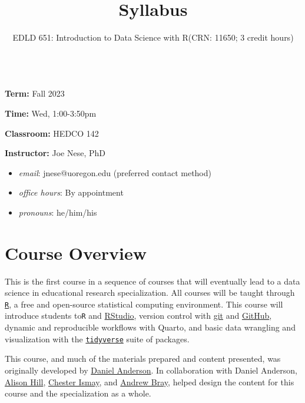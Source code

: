 \documentclass[
  letterpaper,
  DIV=11,
  numbers=noendperiod]{scrartcl}
\title{Syllabus}
\subtitle{EDLD 651: Introduction to Data Science with R(CRN: 11650; 3
credit hours)}
\author{}
\date{}
\providecommand{\tightlist}{%
  \setlength{\itemsep}{0pt}\setlength{\parskip}{0pt}}\usepackage{longtable,booktabs,array}
\renewcommand*\contentsname{Table of contents}
\newcommand\contentsname{Table of contents}
\begin{document}
\maketitle
\ifdefined\Shaded\renewenvironment{Shaded}{\begin{tcolorbox}[sharp corners, interior hidden, boxrule=0pt, frame hidden, breakable, enhanced, borderline west={3pt}{0pt}{shadecolor}]}{\end{tcolorbox}}\fi

\renewcommand*\contentsname{Table of contents}
{
\hypersetup{linkcolor=}
\setcounter{tocdepth}{4}
\tableofcontents
}
\strut \\
\textbf{Term:} Fall 2023

\textbf{Time:} Wed, 1:00-3:50pm

\textbf{Classroom:} HEDCO 142

\textbf{Instructor:} Joe Nese, PhD

\begin{itemize}
\tightlist
\item
  \emph{email}: jnese@uoregon.edu (preferred contact method)
\item
  \emph{office hours}: By appointment
\item
  \emph{pronouns}: he/him/his
\end{itemize}

\hypertarget{course-overview}{%
\section{Course Overview}\label{course-overview}}

This is the first course in a sequence of courses that will eventually
lead to a data science in educational research specialization. All
courses will be taught through
\href{https://cran.r-project.org/}{\texttt{R}}, a free and open-source
statistical computing environment. This course will introduce students
to\texttt{R} and \href{https://www.rstudio.com/}{RStudio}, version
control with \href{https://git-scm.com/}{git} and
\href{https://github.com/}{GitHub}, dynamic and reproducible workflows
with Quarto, and basic data wrangling and visualization with the
\href{https://www.tidyverse.org/}{\texttt{tidyverse}} suite of packages.

This course, and much of the materials prepared and content presented,
was originally developed by \href{https://www.datalorax.com/}{Daniel
Anderson}. In collaboration with Daniel Anderson,
\href{https://twitter.com/apreshill}{Alison Hill},
\href{https://twitter.com/old_man_chester}{Chester Ismay}, and
\href{https://andrewpbray.github.io/}{Andrew Bray}, helped design the
content for this course and the specialization as a whole.
\end{document}
